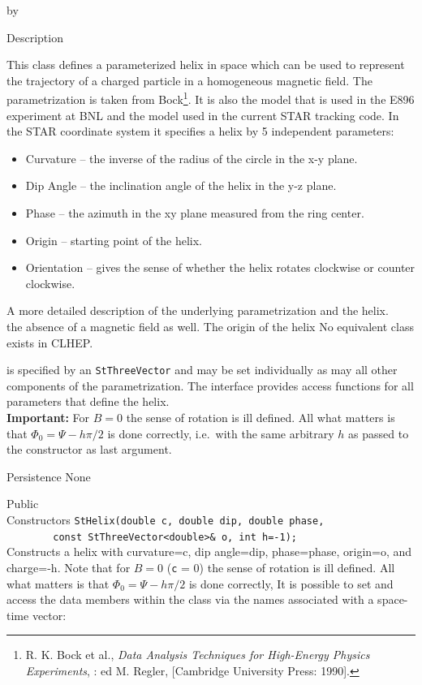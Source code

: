 \documentclass[twoside]{article}
\newcommand{\comp}[1]{\texttt{#1}}%
\newcommand{\entrylabel}[1]{\mbox{\textbf{{#1}}}\hfil}%
\newenvironment{entry}
{\begin{list}{}%
    {\renewcommand{\makelabel}{\entrylabel}%
     \setlength{\labelwidth}{90pt}%
     \setlength{\leftmargin}{\labelwidth}
     \advance\leftmargin by \labelsep%
      }%
    }%
  {\end{list}}
\newcommand{\Entrylabel}[1]%
{\raisebox{0pt}[1ex][0pt]{\makebox[\labelwidth][l]%
    {\parbox[t]{\labelwidth}{\hspace{0pt}\textbf{{#1}}}}}}
\newenvironment{Entry}%
{\renewcommand{\entrylabel}{\Entrylabel}\begin{entry}}%
  {\end{entry}}
\begin{document}
\begin{description}
\begin{Entry}
    
\item[Description]   
    
    This class defines a parameterized helix in space which can be
    used to represent the trajectory of a charged particle in a
    homogeneous magnetic field.  The parametrization is taken from
    Bock\footnote{R. K. Bock et al., {\em Data Analysis Techniques for High-Energy Physics Experiments},
      : ed M. Regler, [Cambridge University Press: 1990]. }.
    It is also the model that is used in
    the E896 experiment at BNL and the model used in the current
    STAR tracking code.  In the STAR coordinate system it specifies
    a helix by 5 independent parameters:
    \begin{itemize}
      \item Curvature -- the inverse of the radius of the circle in the
        x-y plane.
      \item Dip Angle -- the inclination angle of the helix in the y-z plane.
      \item Phase -- the azimuth in the xy plane measured from the ring center.
      \item Origin -- starting point of the helix.
      \item Orientation -- gives the sense of whether the helix rotates
        clockwise or counter clockwise.
    \end{itemize}
    A more detailed description of the underlying parametrization and
    the helix.\\
    the absence of a magnetic field as well.  The origin of the helix
    No equivalent class exists in CLHEP.

    is specified by an \comp{StThreeVector} and may be set
    individually as may all other components of the parametrization.
    The interface provides access functions for all parameters that define
    the helix. \\
    \textbf{Important:} For $B = 0$ the sense of rotation is ill defined.
    All what matters is that $\Phi_0 = \Psi - h \pi/2$ is done correctly,
    i.e.~with the same arbitrary $h$ as passed to the constructor as last
    argument. 

    
\item[Persistence]
    None


\item[Public\\ Constructors]
    \verb+StHelix(double c, double dip, double phase,+\\
    \verb+        const StThreeVector<double>& o, int h=-1);+ \\
    Constructs a helix with curvature=c, dip angle=dip, phase=phase,
    origin=o, and charge=-h.
    Note that for $B = 0$ (\texttt{c} = 0) the sense of rotation is ill defined.
    All what matters is that $\Phi_0 = \Psi - h \pi/2$ is done correctly,
  It is possible to set and access the data members within the class
  via the names associated with a space-time vector:
    

\end{Entry}
\end{description}
\end{document}
